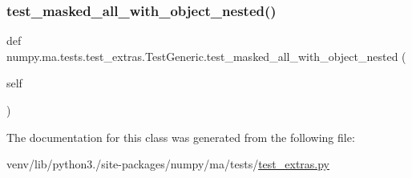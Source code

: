 \subsubsection{\texorpdfstring{test\+\_\+masked\+\_\+all\+\_\+with\+\_\+object\+\_\+nested()}{test\_masked\_all\_with\_object\_nested()}}
{\footnotesize\ttfamily def numpy.\+ma.\+tests.\+test\+\_\+extras.\+Test\+Generic.\+test\+\_\+masked\+\_\+all\+\_\+with\+\_\+object\+\_\+nested (\begin{DoxyParamCaption}\item[{}]{self }\end{DoxyParamCaption})}



The documentation for this class was generated from the following file\+:\begin{DoxyCompactItemize}
\item 
venv/lib/python3./site-\/packages/numpy/ma/tests/\hyperlink{test__extras_8py}{test\+\_\+extras.\+py}\end{DoxyCompactItemize}
